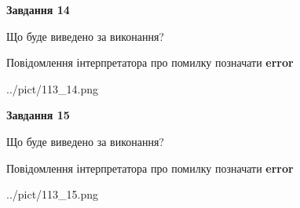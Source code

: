 \documentclass[11pt, ukrainian]{article}
\begin{document}
{\begin {large}
{\begin {center}\textbf{Завдання 14}\end {center}}\par
Що буде виведено за виконання? \par
Повідомлення інтерпретатора про помилку позначати \textbf{error}

\begin{center}
	{../pict/113_14.png}
\end{center}
\newpage

{\begin {center}\textbf{Завдання 15}\end {center}}\par
Що буде виведено за виконання? \par
Повідомлення інтерпретатора про помилку позначати \textbf{error}

\begin{center}
	{../pict/113_15.png}
\end{center}
\newpage

\end {large}}
\end{document}
